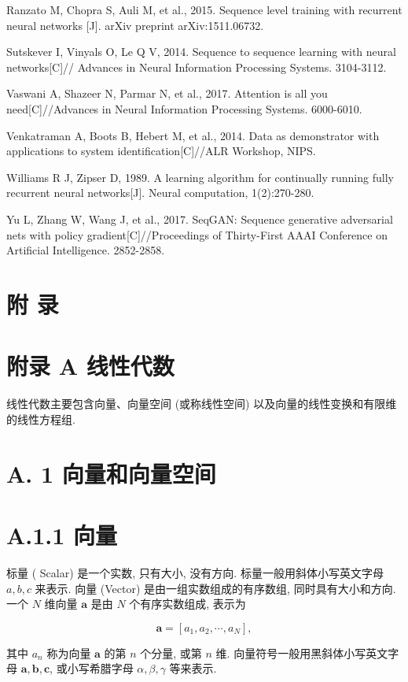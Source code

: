 \documentclass[10pt]{article}
\begin{document}
Ranzato M, Chopra S, Auli M, et al., 2015. Sequence level training with recurrent neural networks [J]. arXiv preprint arXiv:1511.06732.

Sutskever I, Vinyals O, Le Q V, 2014. Sequence to sequence learning with neural networks[C]// Advances in Neural Information Processing Systems. 3104-3112.

Vaswani A, Shazeer N, Parmar N, et al., 2017. Attention is all you need[C]//Advances in Neural Information Processing Systems. 6000-6010.

Venkatraman A, Boots B, Hebert M, et al., 2014. Data as demonstrator with applications to system identification[C]//ALR Workshop, NIPS.

Williams R J, Zipser D, 1989. A learning algorithm for continually running fully recurrent neural networks[J]. Neural computation, 1(2):270-280.

Yu L, Zhang W, Wang J, et al., 2017. SeqGAN: Sequence generative adversarial nets with policy gradient[C]//Proceedings of Thirty-First AAAI Conference on Artificial Intelligence. 2852-2858.

\section*{附 录}
\section*{附录 A 线性代数}
线性代数主要包含向量、向量空间 (或称线性空间) 以及向量的线性变换和有限维的线性方程组.

\section*{A. 1 向量和向量空间}
\section*{A.1.1 向量}
标量 ( Scalar) 是一个实数, 只有大小, 没有方向. 标量一般用斜体小写英文字母 $a, b, c$ 来表示. 向量 (Vector) 是由一组实数组成的有序数组, 同时具有大小和方向. 一个 $N$ 维向量 $\boldsymbol{a}$ 是由 $N$ 个有序实数组成, 表示为


\begin{equation*}
\boldsymbol{a}=\left[a_{1}, a_{2}, \cdots, a_{N}\right], \tag{A.1}
\end{equation*}


其中 $a_{n}$ 称为向量 $\boldsymbol{a}$ 的第 $n$ 个分量, 或第 $n$ 维. 向量符号一般用黑斜体小写英文字母 $\boldsymbol{a}, \boldsymbol{b}, \boldsymbol{c}$, 或小写希腊字母 $\alpha, \beta, \gamma$ 等来表示.
\end{document}
